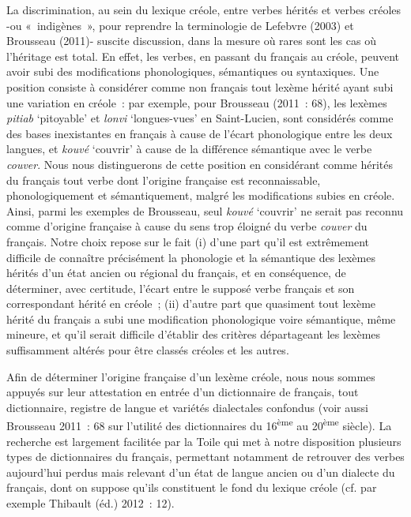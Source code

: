 \documentclass[output=paper]{langsci/langscibook}
\begin{document}
La discrimination, au sein du lexique créole, entre verbes hérités et
verbes créoles -ou «~indigènes~», pour reprendre la terminologie de
Lefebvre (2003) et Brousseau (2011)- suscite discussion, dans la mesure
où rares sont les cas où l'héritage est total. En effet, les verbes, en
passant du français au créole, peuvent avoir subi des modifications
phonologiques, sémantiques ou syntaxiques. Une position consiste à
considérer comme non français tout lexème hérité ayant subi une
variation en créole~: par exemple, pour Brousseau (2011~: 68), les
lexèmes \emph{pitiab} `pitoyable' et \emph{lonvi} `longues-vues' en
Saint-Lucien, sont considérés comme des bases inexistantes en français à
cause de l'écart phonologique entre les deux langues, et \emph{kouvé}
`couvrir' à cause de la différence sémantique avec le verbe
\emph{couver}. Nous nous distinguerons de cette position en considérant
comme hérités du français tout verbe dont l'origine française est
reconnaissable, phonologiquement et sémantiquement, malgré les
modifications subies en créole. Ainsi, parmi les exemples de Brousseau,
seul \emph{kouvé} `couvrir' ne serait pas reconnu comme d'origine
française à cause du sens trop éloigné du verbe \emph{couver} du
français. Notre choix repose sur le fait (i) d'une part qu'il est
extrêmement difficile de connaître précisément la phonologie et la
sémantique des lexèmes hérités d'un état ancien ou régional du français,
et en conséquence, de déterminer, avec certitude, l'écart entre le
supposé verbe français et son correspondant hérité en créole~; (ii)
d'autre part que quasiment tout lexème hérité du français a subi une
modification phonologique voire sémantique, même mineure, et qu'il
serait difficile d'établir des critères départageant les lexèmes
suffisamment altérés pour être classés créoles et les autres.

Afin de déterminer l'origine française d'un lexème créole, nous nous
sommes appuyés sur leur attestation en entrée d'un dictionnaire de
français, tout dictionnaire, registre de langue et variétés dialectales
confondus (voir aussi Brousseau 2011~: 68 sur l'utilité des
dictionnaires du 16\textsuperscript{ème} au 20\textsuperscript{ème}
siècle). La recherche est largement facilitée par la Toile qui met à
notre disposition plusieurs types de dictionnaires du français,
permettant notamment de retrouver des verbes aujourd'hui perdus mais
relevant d'un état de langue ancien ou d'un dialecte du français, dont
on suppose qu'ils constituent le fond du lexique créole (cf. par exemple
Thibault (éd.) 2012~: 12).
\end{document}
